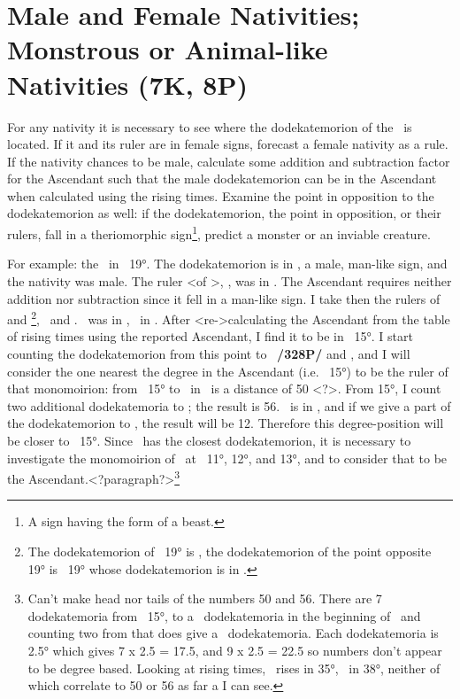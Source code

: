 \section{Male and Female Nativities; Monstrous or Animal-like Nativities (7K, 8P)}

For any nativity it is necessary to see where the dodekatemorion of the \Moon\, is located. If it and its ruler are in female signs, forecast a female nativity as a rule. If the nativity chances to be male, calculate
some addition and subtraction factor for the Ascendant such that the male dodekatemorion can be in the Ascendant when calculated using the rising times. Examine the point in opposition to the dodekatemorion as well: if the dodekatemorion, the point in opposition, or their rulers, fall in a theriomorphic sign\footnote{A sign having the form of a beast.}, predict a monster or an inviable creature.

For example: the \Moon\, in \Pisces\, 19°. The dodekatemorion is in \Libra, a male, man-like sign, and the nativity was male. The ruler <of \Libra>, \Venus, was in \Sagittarius. The Ascendant requires neither addition nor subtraction since it fell in a man-like sign. I take then the rulers of \Libra\, and \Aries\footnote{The dodekatemorion of \Pisces\, 19° is \Aries, the dodekatemorion of the point opposite \Pisces\, 19° is \Virgo\, 19° whose dodekatemorion is in \Libra.}, \Venus\, and \Mars. \Mars\, was in \Virgo, \Venus\, in \Sagittarius. After <re->calculating the Ascendant from the table of rising times using the reported Ascendant, I find it to be in \Leo\, 15°. I start counting the dodekatemorion from this point to \Mars\, \textbf{/328P/} and \Venus, and I will consider the one nearest the degree in the Ascendant (i.e. \Leo\, 15°) to be the ruler of that monomoirion: from \Leo\, 15° to \Mars\, in \Virgo\, is a distance of 50 <?>. From 15°, I count two additional dodekatemoria to \Scorpio; the result is 56. \Venus\, is in \Sagittarius, and
if we give a part of the dodekatemorion to \Sagittarius, the result will be 12. Therefore this degree-position will be closer to \Leo\, 15°. Since \Venus\, has the closest dodekatemorion, it is necessary to investigate the monomoirion of \Venus\, at \Leo\, 11°, 12°, and 13°, and to consider that to be the Ascendant.<?paragraph?>\footnote{Can't make head nor tails of the numbers 50 and 56.  There are 7 dodekatemoria from \Leo\, 15°, to a \Virgo\, dodekatemoria in the beginning of \Virgo\, and counting two from that does give a \Scorpio\, dodekatemoria. Each dodekatemoria is 2.5° which gives 7 x 2.5 = 17.5, and 9 x 2.5 = 22.5 so numbers don't appear to be degree based. Looking at rising times, \Leo\, rises in 35°, \Virgo\, in 38°, neither of which correlate to 50 or 56 as far a I can see.}

